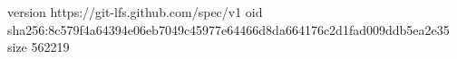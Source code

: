 version https://git-lfs.github.com/spec/v1
oid sha256:8c579f4a64394e06eb7049c45977e64466d8da664176c2d1fad009ddb5ea2e35
size 562219
